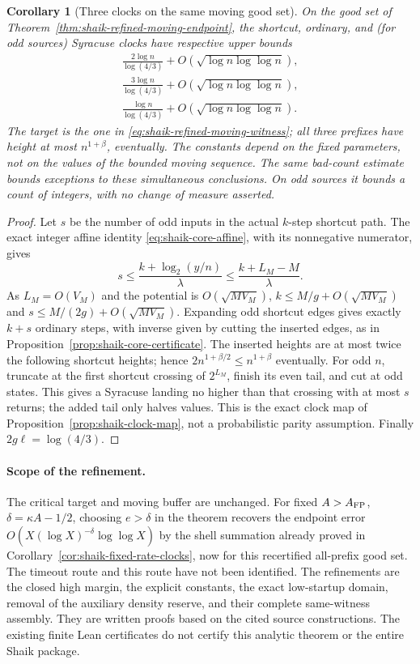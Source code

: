 \documentclass[11pt]{article}
\newtheorem{corollary}[proposition]{Corollary}
\theoremstyle{remark}\newtheorem{remark}[proposition]{Remark}
\begin{document}
\begin{corollary}[Three clocks on the same moving good set]
\label{cor:shaik-refined-moving-clocks}
On the good set of Theorem~\ref{thm:shaik-refined-moving-endpoint},
the shortcut, ordinary, and (for odd sources) Syracuse clocks have
respective upper bounds
\[
 \begin{gathered}
 \frac{2\log n}{\log(4/3)}+O(\sqrt{\log n\log\log n}),\\
 \frac{3\log n}{\log(4/3)}+O(\sqrt{\log n\log\log n}),\\
 \frac{\log n}{\log(4/3)}+O(\sqrt{\log n\log\log n}).
 \end{gathered}
\]
The target is the one in \eqref{eq:shaik-refined-moving-witness};
all three prefixes have height at most \(n^{1+\beta}\), eventually.
The constants depend on the fixed parameters, not on the values of
the bounded moving sequence. The same bad-count estimate bounds
exceptions to these simultaneous conclusions. On odd sources it
bounds a count of integers, with no change of measure asserted.
\end{corollary}
\begin{proof}
Let \(s\) be the number of odd inputs in the actual \(k\)-step
shortcut path. The exact integer affine identity
\eqref{eq:shaik-core-affine}, with its nonnegative numerator, gives
\[
 s\le\frac{k+\log_2(y/n)}{\lambda}
       \le\frac{k+L_M-M}{\lambda}.
\]
As \(L_M=O(V_M)\) and the potential is \(O(\sqrt{MV_M})\),
\(k\le M/g+O(\sqrt{MV_M})\) and
\(s\le M/(2g)+O(\sqrt{MV_M})\).
Expanding odd shortcut edges gives exactly \(k+s\) ordinary steps,
with inverse given by cutting the inserted edges, as in
Proposition~\ref{prop:shaik-core-certificate}. The inserted heights
are at most twice the following shortcut heights; hence
\(2n^{1+\beta/2}\le n^{1+\beta}\) eventually.
For odd \(n\), truncate at the first shortcut crossing of \(2^{L_M}\),
finish its even tail, and cut at odd states. This gives a Syracuse
landing no higher than that crossing with at most \(s\) returns;
the added tail only halves values. This is the exact clock map of
Proposition~\ref{prop:shaik-clock-map}, not a probabilistic parity
assumption. Finally \(2g\ell=\log(4/3)\).
\end{proof}

\paragraph{Scope of the refinement.}
The critical target and moving buffer are unchanged. For fixed
\(A>A_{\rm FP}\), \(\delta=\kappa A-1/2\), choosing \(e>\delta\)
in the theorem recovers the endpoint error
\(O(X(\log X)^{-\delta}\log\log X)\) by the shell summation already
proved in Corollary~\ref{cor:shaik-fixed-rate-clocks}, now for this
recertified all-prefix good set. The timeout route and this route
have not been identified. The refinements are the closed high margin,
the explicit constants, the exact low-startup domain, removal of the
auxiliary density reserve, and their complete same-witness assembly.
They are written proofs based on the cited source constructions.
The existing finite Lean certificates do not certify this analytic
theorem or the entire Shaik package.
\end{document}
